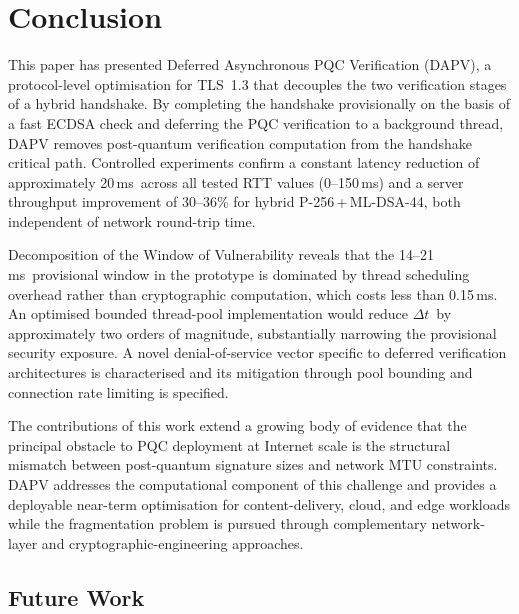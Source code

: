 \documentclass[preprint,10pt,3p]{elsarticle}
\newcommand{\Dt}{\ensuremath{\Delta t}}
\newcommand{\ms}{\,ms}
\begin{document}
\section{Conclusion}
\label{sec:conclusion}

This paper has presented Deferred Asynchronous PQC Verification (DAPV), a
protocol-level optimisation for TLS~1.3 that decouples the two verification
stages of a hybrid handshake.  By completing the handshake provisionally on
the basis of a fast ECDSA check and deferring the PQC verification to a
background thread, DAPV removes post-quantum verification computation from the
handshake critical path.  Controlled experiments confirm a constant latency
reduction of approximately 20\ms\ across all tested RTT values (0--150\ms) and
a server throughput improvement of 30--36\% for hybrid P-256\,+\,ML-DSA-44,
both independent of network round-trip time.

Decomposition of the Window of Vulnerability reveals that the 14--21\ms\
provisional window in the prototype is dominated by thread scheduling overhead
rather than cryptographic computation, which costs less than 0.15\ms.  An
optimised bounded thread-pool implementation would reduce \Dt\ by approximately
two orders of magnitude, substantially narrowing the provisional security
exposure.  A novel denial-of-service vector specific to deferred verification
architectures is characterised and its mitigation through pool bounding and
connection rate limiting is specified.

The contributions of this work extend a growing body of evidence that the
principal obstacle to PQC deployment at Internet scale is the structural
mismatch between post-quantum signature sizes and network MTU constraints.
DAPV addresses the computational component of this challenge and provides a
deployable near-term optimisation for content-delivery, cloud, and edge
workloads while the fragmentation problem is pursued through complementary
network-layer and cryptographic-engineering approaches.

\subsection*{Future Work}
\end{document}
